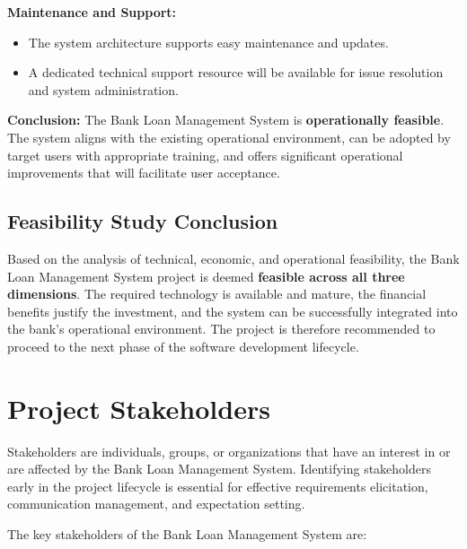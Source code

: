 \documentclass[12pt,a4paper,oneside]{report}
\begin{document}
\textbf{Maintenance and Support:}

\begin{itemize}
  \item The system architecture supports easy maintenance and updates.
  \item A dedicated technical support resource will be available for issue resolution and system administration.
\end{itemize}

\textbf{Conclusion:} The Bank Loan Management System is \textbf{operationally feasible}. The system aligns with the existing operational environment, can be adopted by target users with appropriate training, and offers significant operational improvements that will facilitate user acceptance.

\subsection{Feasibility Study Conclusion}

Based on the analysis of technical, economic, and operational feasibility, the Bank Loan Management System project is deemed \textbf{feasible across all three dimensions}. The required technology is available and mature, the financial benefits justify the investment, and the system can be successfully integrated into the bank's operational environment. The project is therefore recommended to proceed to the next phase of the software development lifecycle.

\section{Project Stakeholders}

Stakeholders are individuals, groups, or organizations that have an interest in or are affected by the Bank Loan Management System. Identifying stakeholders early in the project lifecycle is essential for effective requirements elicitation, communication management, and expectation setting.

The key stakeholders of the Bank Loan Management System are:
\end{document}
